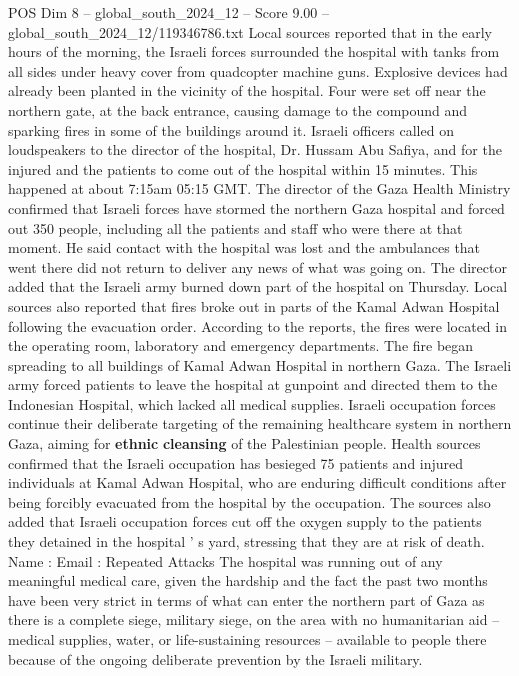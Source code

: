 \begin{textsample}{POS Dim 8 – global\_south\_2024\_12 – Score 9.00 – global\_south\_2024\_12/119346786.txt}  \label{ex:f8_pos_064}
Local sources reported that in the early hours of the morning, the Israeli forces surrounded the hospital with tanks from all sides under heavy cover from quadcopter machine guns.
Explosive devices had already been planted in the vicinity of the hospital.
Four were set off near the northern gate, at the back entrance, causing damage to the compound and sparking fires in some of the buildings around it.
Israeli officers called on loudspeakers to the director of the hospital, Dr.
Hussam Abu Safiya, and for the injured and the patients to come out of the hospital within 15 minutes.
This happened at about 7:15am 05:15 GMT.
The director of the Gaza Health Ministry confirmed that Israeli forces have stormed the northern Gaza hospital and forced out 350 people, including all the patients and staff who were there at that moment.
He said contact with the hospital was lost and the ambulances that went there did not return to deliver any news of what was going on.
The director added that the Israeli army burned down part of the hospital on Thursday.
Local sources also reported that fires broke out in parts of the Kamal Adwan Hospital following the evacuation order.
According to the reports, the fires were located in the operating room, laboratory and emergency departments.
The fire began spreading to all buildings of Kamal Adwan Hospital in northern Gaza.
The Israeli army forced patients to leave the hospital at gunpoint and directed them to the Indonesian Hospital, which lacked all medical supplies.
Israeli occupation forces continue their deliberate targeting of the remaining healthcare system in northern Gaza, aiming for \textbf{ethnic} \textbf{cleansing} of the Palestinian people.
Health sources confirmed that the Israeli occupation has besieged 75 patients and injured individuals at Kamal Adwan Hospital, who are enduring difficult conditions after being forcibly evacuated from the hospital by the occupation.
The sources also added that Israeli occupation forces cut off the oxygen supply to the patients they detained in the hospital ' s yard, stressing that they are at risk of death.
Name : Email : Repeated Attacks The hospital was running out of any meaningful medical care, given the hardship and the fact the past two months have been very strict in terms of what can enter the northern part of Gaza as there is a complete siege, military siege, on the area with no humanitarian aid -- medical supplies, water, or life-sustaining resources -- available to people there because of the ongoing deliberate prevention by the Israeli military.

\end{textsample}
